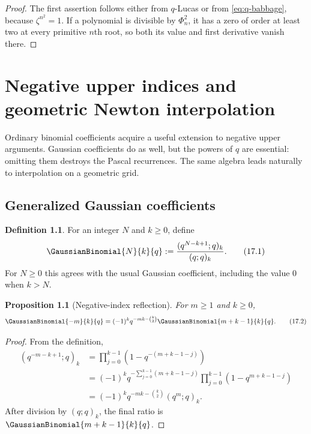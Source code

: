 \documentclass[11pt,a4paper,oneside,openany]{book}
\newtheorem{proposition}[proposition]{Proposition}
\theoremstyle{definition}
\newtheorem{definition}[definition]{Definition}
\theoremstyle{remark}
\begin{document}
\begin{proof}
The first assertion follows either from $q$-Lucas or from \eqref{eq:q-babbage}, because $\zeta^{n^2}=1$.  If a polynomial is divisible by $\Phi_n^2$, it has a zero of order at least two at every primitive $n$th root, so both its value and first derivative vanish there.
\end{proof}

\chapter{Negative upper indices and geometric Newton interpolation}\label{chap:qnewton}

Ordinary binomial coefficients acquire a useful extension to negative upper arguments.  Gaussian coefficients do as well, but the powers of $q$ are essential: omitting them destroys the Pascal recurrences.  The same algebra leads naturally to interpolation on a geometric grid.

\section{Generalized Gaussian coefficients}

\begin{definition}
For an integer $N$ and $k\ge0$, define
\[
 \GaussianBinomial{N}{k}{q}
 :=\frac{(q^{N-k+1};q)_k}{(q;q)_k}.
 \tag{17.1}\label{eq:generalized-gaussian}
\]
For $N\ge0$ this agrees with the usual Gaussian coefficient, including the value $0$ when $k>N$.
\end{definition}

\begin{proposition}[Negative-index reflection]\label{prop:negative-gaussian}
For $m\ge1$ and $k\ge0$,
\[
 \GaussianBinomial{-m}{k}{q}
 =(-1)^kq^{-mk-\binom k2}
   \GaussianBinomial{m+k-1}{k}{q}.
 \tag{17.2}\label{eq:negative-reflection}
\]
\end{proposition}

\begin{proof}
From the definition,
\begin{align*}
 (q^{-m-k+1};q)_k
 &=\prod_{j=0}^{k-1}\left(1-q^{-(m+k-1-j)}\right)\\
 &=(-1)^kq^{-\sum_{j=0}^{k-1}(m+k-1-j)}
   \prod_{j=0}^{k-1}(1-q^{m+k-1-j})\\
 &=(-1)^kq^{-mk-\binom k2}(q^m;q)_k.
\end{align*}
After division by $(q;q)_k$, the final ratio is $\GaussianBinomial{m+k-1}{k}{q}$.
\end{proof}
\end{document}
